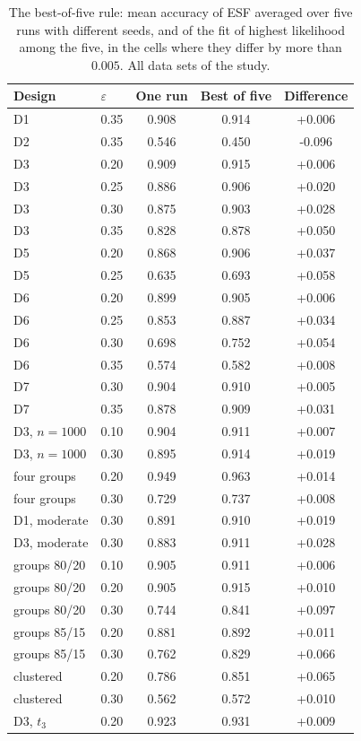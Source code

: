 \begin{table}[htbp]
\centering
\small
\caption{The best-of-five rule: mean accuracy of ESF averaged over five runs with different seeds, and of the fit of highest likelihood among the five, in the cells where they differ by more than $0.005$. All data sets of the study.}
\label{tab:S24}
\begin{tabular}{llccc}
\toprule
Design & $\varepsilon$ & One run & Best of five & Difference \\
\midrule
D1 & 0.35 & 0.908 & 0.914 & +0.006 \\
D2 & 0.35 & 0.546 & 0.450 & -0.096 \\
D3 & 0.20 & 0.909 & 0.915 & +0.006 \\
D3 & 0.25 & 0.886 & 0.906 & +0.020 \\
D3 & 0.30 & 0.875 & 0.903 & +0.028 \\
D3 & 0.35 & 0.828 & 0.878 & +0.050 \\
D5 & 0.20 & 0.868 & 0.906 & +0.037 \\
D5 & 0.25 & 0.635 & 0.693 & +0.058 \\
D6 & 0.20 & 0.899 & 0.905 & +0.006 \\
D6 & 0.25 & 0.853 & 0.887 & +0.034 \\
D6 & 0.30 & 0.698 & 0.752 & +0.054 \\
D6 & 0.35 & 0.574 & 0.582 & +0.008 \\
D7 & 0.30 & 0.904 & 0.910 & +0.005 \\
D7 & 0.35 & 0.878 & 0.909 & +0.031 \\
D3, $n=1000$ & 0.10 & 0.904 & 0.911 & +0.007 \\
D3, $n=1000$ & 0.30 & 0.895 & 0.914 & +0.019 \\
four groups & 0.20 & 0.949 & 0.963 & +0.014 \\
four groups & 0.30 & 0.729 & 0.737 & +0.008 \\
D1, moderate & 0.30 & 0.891 & 0.910 & +0.019 \\
D3, moderate & 0.30 & 0.883 & 0.911 & +0.028 \\
groups 80/20 & 0.10 & 0.905 & 0.911 & +0.006 \\
groups 80/20 & 0.20 & 0.905 & 0.915 & +0.010 \\
groups 80/20 & 0.30 & 0.744 & 0.841 & +0.097 \\
groups 85/15 & 0.20 & 0.881 & 0.892 & +0.011 \\
groups 85/15 & 0.30 & 0.762 & 0.829 & +0.066 \\
clustered & 0.20 & 0.786 & 0.851 & +0.065 \\
clustered & 0.30 & 0.562 & 0.572 & +0.010 \\
D3, $t_3$ & 0.20 & 0.923 & 0.931 & +0.009 \\
\bottomrule
\end{tabular}
\end{table}